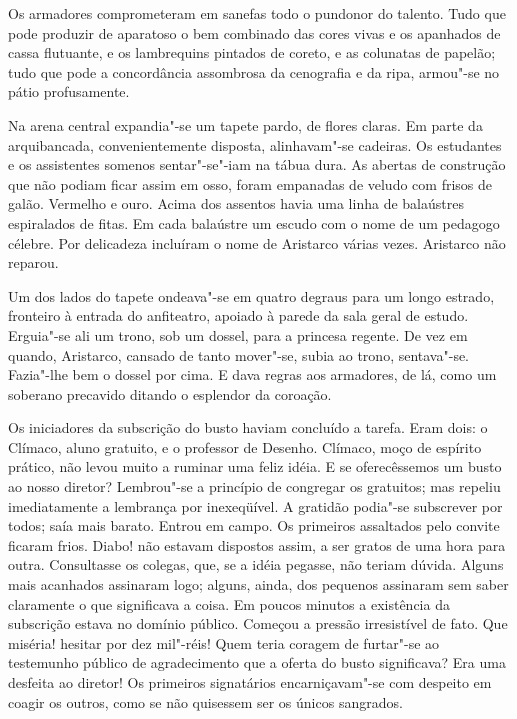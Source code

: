 Os armadores comprometeram em sanefas todo o pundonor do
talento. Tudo que pode produzir de aparatoso o bem combinado das cores
vivas e os apanhados de cassa flutuante, e os lambrequins pintados de
coreto, e as colunatas de papelão; tudo que pode a concordância
assombrosa da cenografia e da ripa, armou"-se no pátio profusamente.

Na arena central expandia"-se um tapete pardo, de flores claras. Em
parte da arquibancada, convenientemente disposta, alinhavam"-se
cadeiras. Os estudantes e os assistentes somenos sentar"-se"-iam na
tábua dura. As abertas de construção que não podiam ficar assim em
osso, foram empanadas de veludo com frisos de galão. Vermelho e ouro.
Acima dos assentos havia uma linha de balaústres espiralados de fitas.
Em cada balaústre um escudo com o nome de um pedagogo célebre. Por
delicadeza incluíram o nome de Aristarco várias vezes. Aristarco não
reparou. 

Um dos lados do tapete ondeava"-se em quatro degraus para um
longo estrado, fronteiro à entrada do anfiteatro, apoiado à parede da
sala geral de estudo. Erguia"-se ali um trono, sob um dossel, para a
princesa regente. De vez em quando, Aristarco, cansado de tanto
mover"-se, subia ao trono, sentava"-se. Fazia"-lhe bem o dossel por
cima. E dava regras aos armadores, de lá, como um soberano precavido
ditando o esplendor da coroação. 

Os iniciadores da subscrição do busto
haviam concluído a tarefa. Eram dois: o Clímaco, aluno gratuito, e o
professor de Desenho. Clímaco, moço de espírito prático, não levou
muito a ruminar uma feliz idéia. E se oferecêssemos um busto ao nosso
diretor? Lembrou"-se a princípio de congregar os gratuitos; mas
repeliu imediatamente a lembrança por inexeqüível. A gratidão
podia"-se subscrever por todos; saía mais barato. Entrou em campo. Os
primeiros assaltados pelo convite ficaram frios. Diabo! não estavam
dispostos assim, a ser gratos de uma hora para outra. Consultasse os
colegas, que, se a idéia pegasse, não teriam dúvida. Alguns mais
acanhados assinaram logo; alguns, ainda, dos pequenos assinaram sem
saber claramente o que significava a coisa. Em poucos minutos a
existência da subscrição estava no domínio público. Começou a pressão
irresistível de fato. Que miséria! hesitar por dez mil"-réis! Quem
teria coragem de furtar"-se ao testemunho público de agradecimento que
a oferta do busto significava? Era uma desfeita ao diretor! Os
primeiros signatários encarniçavam"-se com despeito em coagir os outros, como se
não quisessem ser os únicos sangrados. 

